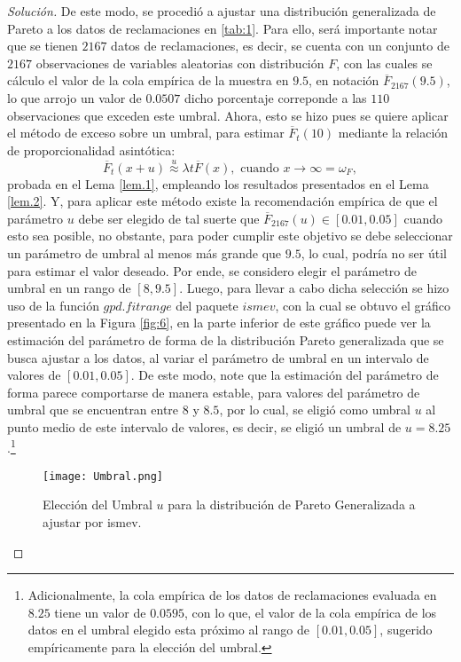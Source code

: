 \documentclass[10.5pt,notitlepage]{article}
\newenvironment{solucion}
  {\begin{proof}[Solución]}
  {\end{proof}}
\newcommand{\approxu}{\overset{u}{\approx}}
\theoremstyle{plain}
\begin{document}
\begin{solucion}
De este modo, se procedió a ajustar una distribución generalizada de Pareto a los datos de reclamaciones en \ref{tab:1}. Para ello, será importante notar que se tienen \(2167\) datos de reclamaciones, es decir, se cuenta con un conjunto de \(2167\) observaciones de variables aleatorias con distribución \(F\), con las cuales se cálculo el valor de la cola empírica de la muestra en \(9.5\), en notación \(\overline{F}_{2167}(9.5)\), lo que arrojo un valor de \(0.0507\) dicho porcentaje correponde a las \(110\) observaciones que exceden este umbral. Ahora, esto se hizo pues se quiere aplicar el método de exceso sobre un umbral, para estimar \(\overline{F}_{t}(10)\) mediante la relación de proporcionalidad asintótica:
\[
\overline{F}_{t}(x + u) \approxu \lambda t \overline{F}(x), \text{ cuando } x \to \infty = \omega_F,
\]
probada en el Lema \ref{lem.1}, empleando los resultados presentados en el Lema \ref{lem.2}. Y, para aplicar este método existe la recomendación empírica de que el parámetro \(u\) debe ser elegido de tal suerte que \(\overline{F}_{2167}(u) \in [0.01, 0.05]\) cuando esto sea posible, no obstante, para poder cumplir este objetivo se debe seleccionar un parámetro de umbral al menos más grande que \(9.5\), lo cual, podría no ser útil para estimar el valor deseado. Por ende, se considero elegir el parámetro de umbral en un rango de \([8,9.5]\). Luego, para llevar a cabo dicha selección se hizo uso de la función \(gpd.fitrange\) del paquete \(ismev\), con la cual se obtuvo el gráfico presentado en la Figura \ref{fig:6}, en la parte inferior de este gráfico puede ver la estimación del parámetro de forma de la distribución Pareto generalizada que se busca ajustar a los datos, al variar el parámetro de umbral en un intervalo de valores de \([0.01,0.05]\). De este modo, note que la estimación del parámetro de forma parece comportarse de manera estable, para valores del parámetro de umbral que se encuentran entre \(8\) y \(8.5\), por lo cual, se eligió como umbral \(u\) al punto medio de este intervalo de valores, es decir, se eligió un umbral de \(u = 8.25\).\footnote{Adicionalmente, la cola empírica de los datos de reclamaciones evaluada en \(8.25\) tiene un valor de \(0.0595\), con lo que, el valor de la cola empírica de los datos en el umbral elegido esta próximo al rango de \([0.01, 0.05]\), sugerido empíricamente para la elección del umbral.} 
\begin{figure}[htb]
    \centering
    \texttt{[image: Umbral.png]}
    \caption{Elección del Umbral \(u\) para la distribución de Pareto Generalizada a ajustar por ismev.}

\end{figure}
\end{solucion}
\end{document}
